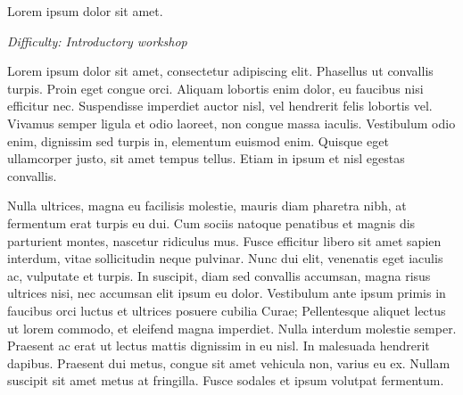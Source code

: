 %
%
%

\newif\ifprint
\printtrue



\newcommand{\workshopTitle}{Workshop n: }

\newcommand{\workshopAuthor}{Joe Bloggs}



	
	
	Lorem ipsum dolor sit amet.
	
	\textit{Difficulty: Introductory workshop}
	
	\ifprint
		\renewcommand{\baselinestretch}{0.75}\normalsize
		\tableofcontents
		\renewcommand{\baselinestretch}{1.0}\normalsize
	\else
		\tableofcontents
	\fi
	
	
	Lorem ipsum dolor sit amet, consectetur adipiscing elit. Phasellus ut convallis turpis. Proin eget congue orci. Aliquam lobortis enim dolor, eu faucibus nisi efficitur nec. Suspendisse imperdiet auctor nisl, vel hendrerit felis lobortis vel. Vivamus semper ligula et odio laoreet, non congue massa iaculis. Vestibulum odio enim, dignissim sed turpis in, elementum euismod enim. Quisque eget ullamcorper justo, sit amet tempus tellus. Etiam in ipsum et nisl egestas convallis.
	
	Nulla ultrices, magna eu facilisis molestie, mauris diam pharetra nibh, at fermentum erat turpis eu dui. Cum sociis natoque penatibus et magnis dis parturient montes, nascetur ridiculus mus. Fusce efficitur libero sit amet sapien interdum, vitae sollicitudin neque pulvinar. Nunc dui elit, venenatis eget iaculis ac, vulputate et turpis. In suscipit, diam sed convallis accumsan, magna risus ultrices nisi, nec accumsan elit ipsum eu dolor. Vestibulum ante ipsum primis in faucibus orci luctus et ultrices posuere cubilia Curae; Pellentesque aliquet lectus ut lorem commodo, et eleifend magna imperdiet. Nulla interdum molestie semper. Praesent ac erat ut lectus mattis dignissim in eu nisl. In malesuada hendrerit dapibus. Praesent dui metus, congue sit amet vehicula non, varius eu ex. Nullam suscipit sit amet metus at fringilla. Fusce sodales et ipsum volutpat fermentum.
	
